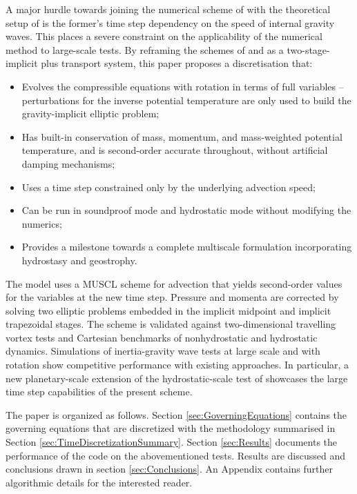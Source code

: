 \documentclass{ametsoc}
\theoremstyle{definition}
\begin{document}
A major hurdle towards joining the numerical scheme of \cite{BenacchioEtAl2014} with the theoretical setup of \cite{KleinBenacchio2016} is the former's time step dependency on the speed of internal gravity waves. This places a severe constraint on the applicability of the numerical method to large-scale tests. By reframing the schemes of \cite{KleinTCFD2009} and \cite{BenacchioEtAl2014} as a two-stage-implicit plus transport system, this paper proposes a discretisation that:
%
\begin{itemize}
\item Evolves the compressible equations with rotation in terms of full variables -- perturbations for the inverse potential temperature are only used to build the gravity-implicit elliptic problem;
\item Has built-in conservation of mass, momentum, and mass-weighted potential temperature, and is second-order accurate throughout, without artificial damping mechanisms;
\item Uses a time step constrained only by the underlying advection speed;
\item Can be run in soundproof mode and hydrostatic mode without modifying the numerics;
\item Provides a milestone towards a complete multiscale formulation incorporating hydrostasy and geostrophy.  
\end{itemize}

The model uses a MUSCL scheme for advection that yields second-order values for the variables at the new time step. Pressure and momenta are corrected by solving two elliptic problems embedded in the implicit midpoint and implicit trapezoidal stages. The scheme is validated  against two-dimensional travelling vortex tests and Cartesian benchmarks of nonhydrostatic and hydrostatic dynamics. Simulations of inertia-gravity wave tests at large scale and with rotation show competitive performance with existing approaches. In particular, a new planetary-scale extension of the hydrostatic-scale test of \cite{SkamarockKlemp1994} showcases the large time step capabilities of the present scheme.

The paper is organized as follows. Section \ref{sec:GoverningEquations} contains the governing equations that are discretized with the methodology summarised in Section \ref{sec:TimeDiscretizationSummary}. Section \ref{sec:Results} documents the performance of the code on the abovementioned tests. Results are discussed and conclusions drawn in section \ref{sec:Conclusions}. An Appendix contains further algorithmic details for the interested reader.
\end{document}
